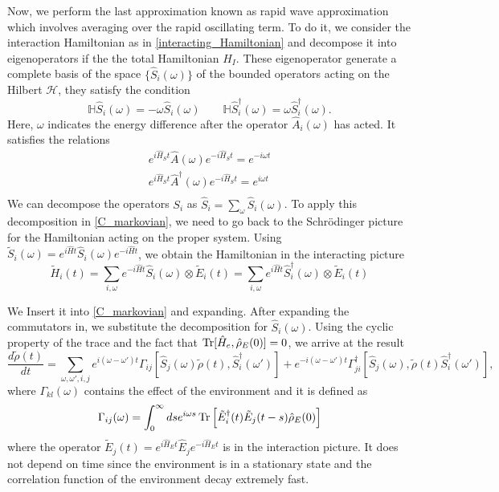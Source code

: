 Now, we perform the last approximation known as rapid wave approximation which involves averaging over the rapid oscillating term. To do it, we consider the interaction Hamiltonian as in \eqref{interacting_Hamiltonian} and decompose it into eigenoperators if the the total Hamiltonian $H_I$.
These eigenoperator generate a complete basis of the space $\{\hat S_i(\omega)\}$ of the bounded operators acting on the Hilbert $\mathcal{H}$, they satisfy the condition
\begin{equation}
    \mathbb{H}\hat S_i(\omega) = -\omega \hat S_i(\omega) \qquad \mathbb{H}\hat S_i^\dagger(\omega) = \omega \hat S_i^\dagger(\omega).
\end{equation}
Here, $\omega$ indicates the energy difference after the operator $\hat A_i(\omega)$ has acted.
It satisfies the relations
\begin{equation}
    \begin{split}
        e^{i\hat H_St}\hat A(\omega)e^{-i\hat H_St} = e^{-i\omega t}\\
        e^{i\hat H_St}\hat A^\dagger(\omega)e^{-i\hat H_St} = e^{i\omega t}\\
    \end{split}
\end{equation}
We can decompose the operators $S_i$ as $\hat S_i = \sum_\omega \hat S_i(\omega)$.
To apply this decomposition in \eqref{C_markovian}, we need to go back to the Schrödinger picture for the Hamiltonian acting on the proper system. Using $\tilde S_i(\omega)=e^{i\hat Ht}\hat S_i(\omega)e^{-i\hat H t}$, we obtain the Hamiltonian in the interacting picture
\begin{equation}\label{eigen_Hamiltonian}
    \tilde H_i(t) = \sum_{i,\omega} e^{-i\hat Ht}\hat S_i(\omega) \otimes \tilde E_i (t)= \sum_{i,\omega} e^{i\hat Ht}\hat S_i^\dagger(\omega) \otimes \tilde E_i (t)
\end{equation}

We Insert it into \eqref{C_markovian} and expanding.
After expanding the commutators in, we substitute the decomposition for $\hat S_i(\omega)$. Using the cyclic property of the trace and the fact that $\operatorname{Tr}[\hat H_e,\hat\rho_E(0)]=0$, we arrive at the result
\begin{equation}\label{c_substitue}
    \frac{d\tilde\rho(t)}{dt} = \sum_{\omega,\omega',i,j}e^{i(\omega-\omega')t}\Gamma_{ij}\left[\hat S_j(\omega)\tilde\rho(t),\hat S_i^\dagger(\omega')\right]+ e^{-i(\omega-\omega')t}\Gamma_{ji}^\dagger\left[\hat S_j(\omega),\tilde\rho(t)\hat S_i^\dagger(\omega')\right],
\end{equation}
where $\Gamma_{kl}(\omega)$ contains the effect of the environment and it is defined as
\begin{equation}\label{environment_coefficients}
    \Gamma_{ij}(\omega) = \int_{0}^{\infty}ds e^{i\omega s}\operatorname{Tr}\left[\tilde E_i^\dagger(t)\tilde E_j(t-s)\hat\rho_E(0)\right]
\end{equation}
where the operator $\tilde E_j(t)=e^{i\hat H_E t}\hat E_j e^{-i\hat H_E t}$ is in the interaction picture. It does not depend on time since the environment is in a stationary state and the correlation function of the environment decay extremely fast.

